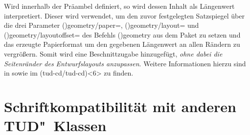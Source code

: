 \begin{DeclareEntity}{}
\begin{Declaration}
  {}
\printdeclarationlist

Wird  innerhalb der Präambel definiert, so wird dessen 
Inhalt als Längenwert interpretiert. Dieser wird verwendet, um den zuvor 
festgelegten Satzspiegel über die drei Parameter
\Macro*(){geometry/paper=},
\Macro*(){geometry/layout=} und 
\Macro*(){geometry/layoutoffset=\PLength} 
des Befehls \Macro*(){geometry} aus dem Paket 
 zu setzen und 
das erzeugte Papierformat um den gegebenen Längenwert an allen Rändern zu 
vergrößern. Somit wird eine Beschnittzugabe hinzugefügt, 
\emph{ohne dabei die Seitenränder des Entwurfslayouts anzupassen}. Weitere 
Informationen hierzu sind in  sowie im 
\GitHubRepo(tud-cd/tud-cd)<6> zu finden.
\end{Declaration}
%
\end{DeclareEntity}



\section[%
  Das Paket \Package{fix-tudscrfonts} -- Schriftkompatibilität%
]{%
  Schriftkompatibilität mit anderen TUD"~Klassen%
}

